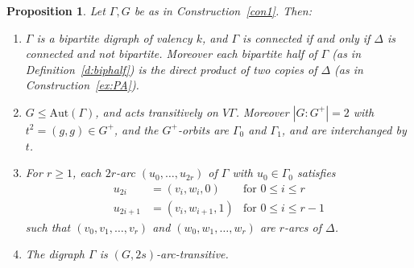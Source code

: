 \documentclass[11pt]{amsart}
\newtheorem{proposition}[theorem]{Proposition}
\newcommand{\Aut}{\mathrm{Aut}}
\begin{document}

\begin{proposition}\label{thm: bi-quasi con}
    Let $\Gamma, G$ be as in Construction~\ref{con1}. Then: 
        \begin{enumerate}
            
        \item[(a)] \(\Gamma\) is a bipartite digraph of valency \(k\), and \(\Gamma\) is connected if and only if \(\Delta\) is connected and not bipartite. Moreover each bipartite half of $\Gamma$ (as in Definition~\ref{d:biphalf}) is the direct product of two copies of $\Delta$ (as in Construction~\ref{ex:PA}).
        
        \item[(b)] 
        $G\leqslant \Aut(\Gamma)$, and acts transitively on \(V\Gamma\). Moreover $|G:G^+|=2$ with $t^2=(g,g)\in G^+$, and the $G^+$-orbits are $\Gamma_0$ and $\Gamma_1$, and are interchanged by $t$. 
        
        \item[(c)] For $r\geq1$, each $2r$-arc $(u_0,\dots, u_{2r})$ of $\Gamma$ with $u_0\in \Gamma_0$  satisfies
        \begin{align*}
            u_{2i} &= (v_i,w_i,0) &\mbox{for $0\leq i\leq r$}\\
            u_{2i+1} &= (v_i,w_{i+1},1) &\mbox{for $0\leq i\leq r-1$}
        \end{align*}
        such that $(v_0,v_1,\dots,v_r)$ and $(w_0,w_1,\dots,w_r)$ are $r$-arcs of $\Delta$.
        \item[(d)] The digraph $\Gamma$ is $(G,2s)$-arc-transitive.
    \end{enumerate}
\end{proposition}

 
\end{document}

